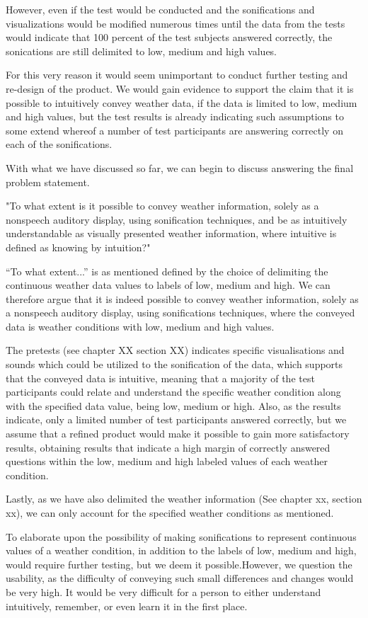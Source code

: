 However, even if the test would be conducted and the sonifications and visualizations would be modified numerous times until the data from the tests would indicate that 100 percent of the test subjects answered correctly, the sonications are still delimited to low, medium and high values. 

For this very reason it would seem unimportant to conduct further testing and re-design of the product. We would gain evidence to support the claim that it is possible to intuitively convey weather data, if the data is limited to low, medium and high values, but the test results is already indicating such assumptions to some extend whereof a number of test participants are answering correctly on each of the sonifications.


With what we have discussed so far, we can begin to discuss answering the final problem statement.


"To what extent is it possible to convey weather information, solely as a nonspeech auditory display, using sonification techniques, and be as intuitively understandable as visually presented weather information, where intuitive is defined as knowing by intuition?"


“To what extent...” is as mentioned defined by the choice of delimiting the continuous weather data values to labels of low, medium and high. We can therefore argue that it is indeed possible to convey weather information, solely as a nonspeech auditory display, using sonifications techniques, where the conveyed data is weather conditions with low, medium and high values. 

The pretests (see chapter XX section XX)  indicates specific visualisations and sounds which could be utilized to the sonification of the data, which supports that the conveyed data is intuitive, meaning that a majority of the test participants could relate and understand the specific weather condition along with the specified data value, being low, medium or high. Also, as the results indicate, only a limited number of test participants answered correctly, but we assume that a refined product would make it possible to gain more satisfactory results, obtaining results that indicate a high margin of correctly answered questions within the low, medium and high labeled values of each weather condition.

Lastly, as we have also delimited the weather information (See chapter xx, section xx), we can only account for the specified weather conditions as mentioned.

To elaborate upon the possibility of making sonifications to represent continuous values of a weather condition, in addition to the labels of low, medium and high, would require further testing, but we deem it possible.However, we question the usability, as the difficulty of conveying such small differences and changes would be very high. It would be very difficult for a person to either understand intuitively, remember, or even learn it in the first place.



